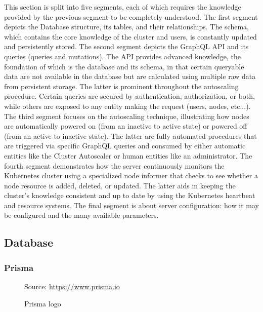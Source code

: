 This section is split into five segments, each of which requires the knowledge
provided by the previous segment to be completely understood. The first segment depicts
the Database structure, its tables, and their relationships. The schema, which contains
the core knowledge of the cluster and users, is constantly updated and
persistently stored. The second segment depicts the GraphQL API and its queries (queries
and mutations). The API provides advanced knowledge, the foundation of which is the
database and its schema, in that certain queryable data are not available in the
database but are calculated using multiple raw data from persistent storage. The
latter is prominent throughout the autoscaling procedure. Certain queries are
secured by authentication, authorization, or both, while others are exposed to any
entity making the request (users, nodes, etc...). The third segment focuses on the
autoscaling technique, illustrating how nodes are automatically powered on (from
an inactive to active state) or powered off (from an active to inactive state). The
latter are fully automated procedures that are triggered via specific GraphQL queries
and consumed by either automatic entities like the Cluster Autoscaler or human entities
like an administrator. The fourth segment demonstrates how the server
continuously monitors the Kubernetes cluster using a specialized node informer
that checks to see whether a node resource is added, deleted, or updated. The latter
aids in keeping the cluster's knowledge consistent and up to date by using the Kubernetes
heartbeat and resource systems. The final segment is about server configuration:
how it may be configured and the many available parameters.

\subsection{Database}
\label{subsec:implementation_server_database}

\subsubsection{Prisma}
\label{subsubsec:implementation_server_database_prisma}

\begin{figure} %
  \centering
  \def\stackalignment{r} %
  {\scriptsize \parbox[t]{\linewidth}{ Source: \url{https://www.prisma.io}} }
  \caption{Prisma logo}
\end{figure}

